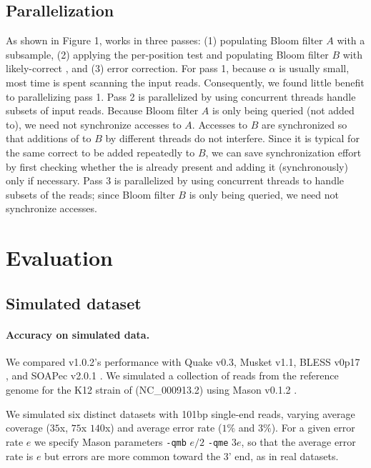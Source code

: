 \documentclass{bmcart}
\begin{document}
\subsection*{Parallelization} 
As shown in Figure 1, \tool works in three passes: (1) populating Bloom filter $A$ with a \kmer subsample, (2) applying the per-position test and populating Bloom filter $B$ with likely-correct \kmers, and (3) error correction.  For pass 1, because $\alpha$ is usually small, most time is spent scanning the input reads.  Consequently, we found little benefit to parallelizing pass 1.  Pass 2 is parallelized by using concurrent threads handle subsets of input reads.  Because Bloom filter $A$ is only being queried (not added to), we need not synchronize accesses to $A$.  Accesses to $B$ are synchronized so that additions of \kmers to $B$ by different threads do not interfere.  Since it is typical for the same correct \kmer to be added repeatedly to $B$, we can save synchronization effort by first checking whether the \kmer is already present and adding it (synchronously) only if necessary.  Pass 3 is parallelized by using concurrent threads to handle subsets of the reads; since Bloom filter $B$ is only being queried, we need not synchronize accesses.

\section*{Evaluation}
\subsection*{Simulated dataset}

\paragraph{Accuracy on simulated data.} We compared \tool v1.0.2's performance with Quake v0.3\cite{kelley2010quake}, Musket v1.1\cite{liu2013musket}, BLESS v0p17 \cite{heo2014bless}, and SOAPec v2.0.1 \cite{luo2012soapdenovo2}.  We simulated a collection of reads from the reference genome for the K12 strain of \ecoli (NC\_000913.2) using Mason v0.1.2 \cite{holtgrewe2010mason}.  

We simulated six distinct datasets with 101bp single-end reads, varying average coverage ($35$x, $75$x $140$x) and average error rate ($1\%$ and $3\%$).  For a given error rate $e$ we specify Mason parameters \verb+-qmb+ $e/2$ \verb+-qme+ $3e$, so that the average error rate is $e$ but errors are more common toward the 3' end, as in real datasets.
\end{document}
